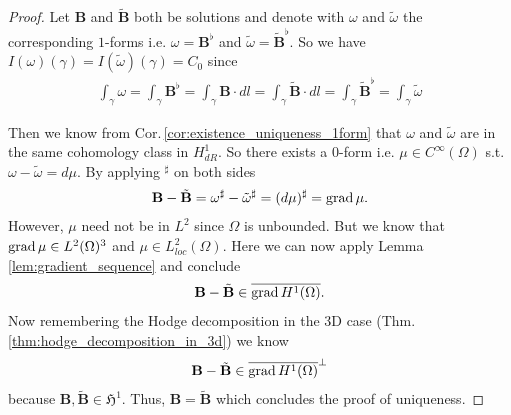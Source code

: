 \documentclass[../main.tex]{subfiles}
\begin{document}
\begin{proof}
    Let $\mathbf{B}$ and $\tilde{\mathbf{B}}$ both be solutions and denote with $\omega$ 
    and $\tilde{\omega}$ the corresponding $1$-forms i.e. $\omega =
    \mathbf{B}^\flat$ and $\tilde{\omega} = \tilde{\mathbf{B}}^\flat$. 
    So we have $I(\omega)(\gamma) = I(\tilde{\omega})(\gamma) = C_0$
    since 
    \begin{align*}
        \int_\gamma \omega = \int_\gamma \mathbf{B}^\flat = 
        \int_\gamma \mathbf{B} \cdot dl = \int_\gamma \tilde{\mathbf{B}}\cdot dl 
        = \int_\gamma \tilde{\mathbf{B}}^\flat = \int_\gamma \tilde{\omega}
    \end{align*}

    Then we know from Cor.\,\ref{cor:existence_uniqueness_1form} 
    that $\omega$ and $\tilde{\omega}$ are in the 
    same cohomology class in $H^1_{dR}$. So there exists a $0$-form i.e. 
    $\mu \in C^\infty(\Omega)$ s.t. $\omega - \tilde{\omega} = d\mu$.
    By applying $^\sharp$ on both sides
    \begin{align*}
        \mathbf{B} - \tilde{\mathbf{B}} 
        = \omega^\sharp - \tilde{\omega}^\sharp
        = (d\mu)^\sharp = \operatorname{grad} \mu.
    \end{align*}
    However, $\mu$ need not be in $L^2$ since $\Omega$ is unbounded.
    But we know that $\operatorname{grad} \mu \in L^2(\Omega)^3$ and 
    $\mu \in L^2_{loc}(\Omega)$. 
    Here we can now apply Lemma \ref{lem:gradient_sequence} and conclude
    \begin{align*}
        \mathbf{B} - \tilde{\mathbf{B}} \in \overline{\operatorname{grad} H^1(\Omega)}.
    \end{align*}
    Now remembering the Hodge decomposition in the 3D case (Thm.\,\ref{thm:hodge_decomposition_in_3d}) we know 
    \begin{align*}
        \mathbf{B} - \tilde{\mathbf{B}} \in \overline{\operatorname{grad} H^1(\Omega)}^\perp
    \end{align*}
    because $\mathbf{B}, \tilde{\mathbf{B}} \in \mathfrak{H}^1$.
    Thus, $\mathbf{B} = \tilde{\mathbf{B}}$ which concludes the proof of uniqueness.
\end{proof}
\printbibliography
\end{document}
